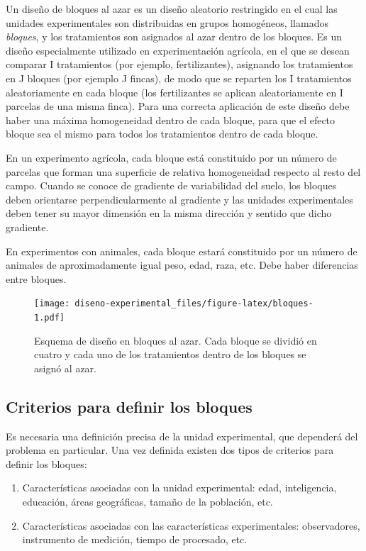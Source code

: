 \documentclass[]{book}
\theoremstyle{definition}
\theoremstyle{definition}
\theoremstyle{definition}
\theoremstyle{remark}
\begin{document}
Un diseño de bloques al azar es un diseño aleatorio restringido en el
cual las unidades experimentales son distribuidas en grupos homogéneos,
llamados \emph{bloques}, y los tratamientos son asignados al azar dentro
de los bloques. Es un diseño especialmente utilizado en experimentación
agrícola, en el que se desean comparar I tratamientos (por ejemplo,
fertilizantes), asignando los tratamientos en J bloques (por ejemplo J
fincas), de modo que se reparten los I tratamientos aleatoriamente en
cada bloque (los fertilizantes se aplican aleatoriamente en I parcelas
de una misma finca). Para una correcta aplicación de este diseño debe
haber una máxima homogeneidad dentro de cada bloque, para que el efecto
bloque sea el mismo para todos los tratamientos dentro de cada bloque.

En un experimento agrícola, cada bloque está constituido por un número
de parcelas que forman una superficie de relativa homogeneidad respecto
al resto del campo. Cuando se conoce de gradiente de variabilidad del
suelo, los bloques deben orientarse perpendicularmente al gradiente y
las unidades experimentales deben tener su mayor dimensión en la misma
dirección y sentido que dicho gradiente.

En experimentos con animales, cada bloque estará constituido por un
número de animales de aproximadamente igual peso, edad, raza, etc. Debe
haber diferencias entre bloques.





\begin{figure}
\centering
\texttt{[image: diseno-experimental\_files/figure-latex/bloques-1.pdf]}
\caption{\label{fig:bloques}Esquema de diseño en bloques al azar. Cada bloque se
dividió en cuatro y cada uno de los tratamientos dentro de los bloques
se asignó al azar.}
\end{figure}

\hypertarget{criterios-para-definir-los-bloques}{%
\subsection{Criterios para definir los
bloques}\label{criterios-para-definir-los-bloques}}

Es necesaria una definición precisa de la unidad experimental, que
dependerá del problema en particular. Una vez definida existen dos tipos
de criterios para definir los bloques:

\begin{enumerate}
\def\labelenumi{\arabic{enumi}.}
\item
  Características asociadas con la unidad experimental: edad,
  inteligencia, educación, áreas geográficas, tamaño de la población,
  etc.
\item
  Características asociadas con las características experimentales:
  observadores, instrumento de medición, tiempo de procesado, etc.
\end{enumerate}
\end{document}
